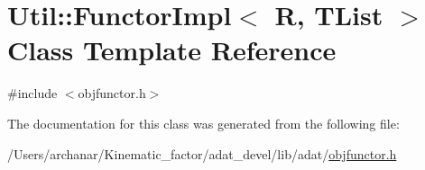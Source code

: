 \hypertarget{classUtil_1_1FunctorImpl}{}\section{Util\+:\+:Functor\+Impl$<$ R, T\+List $>$ Class Template Reference}
\label{classUtil_1_1FunctorImpl}


{\ttfamily \#include $<$objfunctor.\+h$>$}



The documentation for this class was generated from the following file\+:\begin{DoxyCompactItemize}
\item 
/\+Users/archanar/\+Kinematic\+\_\+factor/adat\+\_\+devel/lib/adat/\mbox{\hyperlink{lib_2adat_2objfunctor_8h}{objfunctor.\+h}}\end{DoxyCompactItemize}

